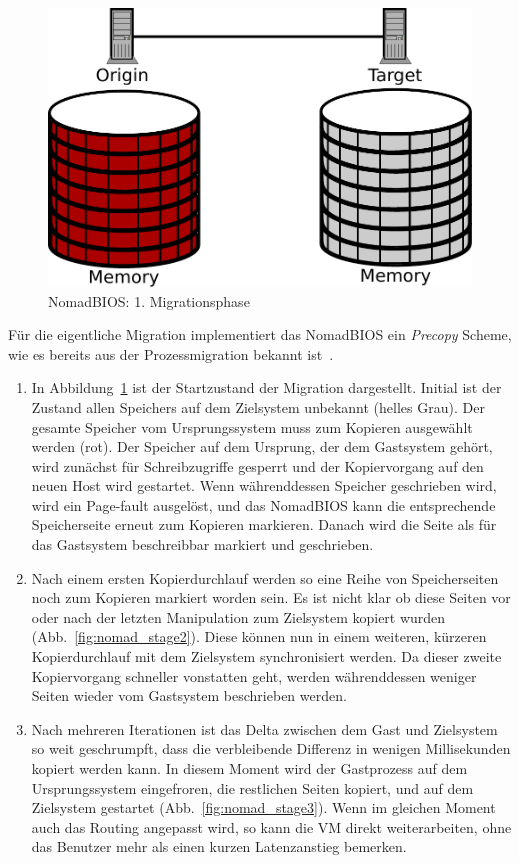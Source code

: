 \begin{figure}[b]
  \centering
  \includegraphics[width=0.7\linewidth]{images/nomad_stage1}
  \caption{NomadBIOS: 1. Migrationsphase}
  \label{fig:nomad_stage1}
\end{figure}
Für die eigentliche Migration implementiert das NomadBIOS ein
\emph{Precopy} Scheme, wie es bereits aus der Prozessmigration bekannt
ist~\cite{hansen2002nomadic}.
\begin{enumerate}
\item In Abbildung~\ref{fig:nomad_stage1} ist der Startzustand der
  Migration dargestellt. Initial ist der Zustand allen Speichers auf
  dem Zielsystem unbekannt (helles Grau). Der gesamte Speicher vom
  Ursprungssystem muss zum Kopieren ausgewählt werden (rot). Der
  Speicher auf dem Ursprung, der dem Gastsystem gehört, wird zunächst
  für Schreibzugriffe gesperrt und der Kopiervorgang auf den neuen
  Host wird gestartet. Wenn währenddessen Speicher geschrieben wird,
  wird ein Page-fault ausgelöst, und das NomadBIOS kann die
  entsprechende Speicherseite erneut zum Kopieren markieren. Danach
  wird die Seite als für das Gastsystem beschreibbar markiert und
  geschrieben.
\item Nach einem ersten Kopierdurchlauf werden so eine Reihe von
  Speicherseiten noch zum Kopieren markiert worden sein. Es ist nicht
  klar ob diese Seiten vor oder nach der letzten Manipulation zum
  Zielsystem kopiert wurden (Abb.~\ref{fig:nomad_stage2}). Diese
  können nun in einem weiteren, kürzeren Kopierdurchlauf mit dem
  Zielsystem synchronisiert werden. Da dieser zweite Kopiervorgang
  schneller vonstatten geht, werden währenddessen weniger Seiten
  wieder vom Gastsystem beschrieben werden.
\item Nach mehreren Iterationen ist das Delta zwischen dem Gast und
  Zielsystem so weit geschrumpft, dass die verbleibende Differenz in
  wenigen Millisekunden kopiert werden kann. In diesem Moment wird der
  Gastprozess auf dem Ursprungssystem eingefroren, die restlichen
  Seiten kopiert, und auf dem Zielsystem gestartet
  (Abb.~\ref{fig:nomad_stage3}). Wenn im gleichen Moment auch das
  Routing angepasst wird, so kann die \ac{VM} direkt weiterarbeiten, ohne
  das Benutzer mehr als einen kurzen Latenzanstieg bemerken.
\end{enumerate}
